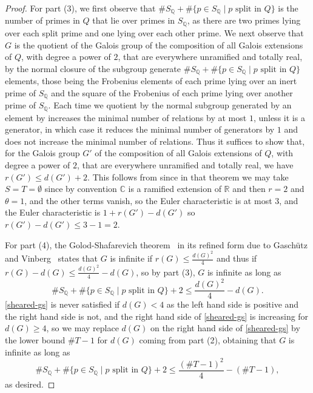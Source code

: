 \documentclass[12pt]{amsart}
\theoremstyle{remark}
\theoremstyle{definition}
\begin{document}
\begin{proof}
For part (3), we first observe that $ \# S_\mathbb Q + \# \{p \in S_\mathbb Q \mid p \textrm{ split in }Q \} $ is the number of primes in $Q$ that lie over primes in $S_{\mathbb Q}$, as there are two primes lying over each split prime and one lying over each other prime. We next observe that $G$ is the quotient of the Galois group of the composition of all Galois extensions of $Q$, with degree a power of $2$, that are everywhere unramified and totally real, by the normal closure of the subgroup generate $ \# S_\mathbb Q  + \# \{p \in S_\mathbb Q \mid p \textrm{ split in }Q \} $ elements, those being the Frobenius elements of each prime lying over an inert prime of $S_{\mathbb Q}$ and the square of the Frobenius of each prime lying over another prime of $S_{\mathbb Q}$. Each time we quotient by the normal subgroup generated by an element by increases the minimal number of relations by at most $1$,  unless it is a generator, in which case it reduces the minimal number of generators by $1$ and does not increase the minimal number of relations. Thus it suffices to show that, for the Galois group $G'$ of the composition of all Galois extensions of $Q$, with degree a power of $2$, that are everywhere unramified and totally real, we have $r(G')\leq d(G')+2$. This follows from \cite[Theorem 10.7.12]{Neukirch2008} since in that theorem we may take $S =T=\emptyset$ since by convention $\mathbb C$ is a ramified extension of $\mathbb R$ and then $r=2$ and $\theta=1$, and the other terms vanish, so the Euler characteristic is at most $3$, and the Euler characteristic is $1+r(G')-d(G')$ so $r(G')-d(G')\leq 3-1=2$. 

For part (4), the Golod-Shafarevich theorem~\cite{GolodShafarevich} in its refined form due to Gasch\"utz and Vinberg~\cite{Vinberg1965,Koch1969} states that $G$ is infinite if $r(G) \leq \frac{ d(G)^2}{4}$ and thus if $r(G) -d(G) \leq \frac{d(G)^2}{4} - d(G)$, so by part (3), $G$ is infinite as long as 
\begin{equation}\label{sheared-gs} \# S_\mathbb Q + \# \{p \in S_\mathbb Q \mid p \textrm{ split in }Q \} +2  \leq  \frac{d(G)^2}{4} - d(G). \end{equation} 
\eqref{sheared-gs} is never satisfied if $d(G) <4$ as the left hand side is positive and the right hand side is not, and the right hand side of \eqref{sheared-gs} is increasing for $d(G) \geq 4$, so we may replace $d(G)$ on the right hand side of \eqref{sheared-gs} by the lower bound $\#T-1$ for $d(G)$ coming from part (2), obtaining that $G$ is infinite as long as
\[  \# S_\mathbb Q + \# \{p \in S_\mathbb Q \mid p \textrm{ split in }Q \} +2 \leq  \frac{ (\#T -1)^2}{4}  - (\#T -1),\] as desired.
\end{proof}
\end{document}

